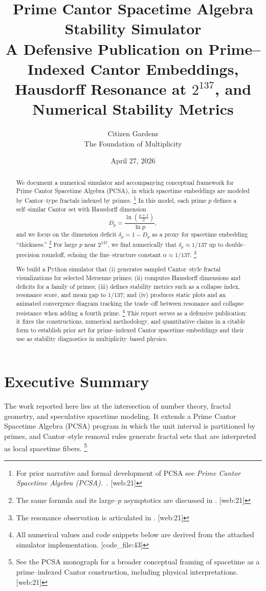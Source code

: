 \documentclass[11pt]{article}
\title{%
Prime Cantor Spacetime Algebra Stability Simulator\\[4pt]
\large A Defensive Publication on Prime–Indexed Cantor Embeddings,\\
Hausdorff Resonance at $2^{137}$, and Numerical Stability Metrics}
\author{Citizen Gardens \\ The Foundation of Multiplicity}
\date{April 27, 2026}
\begin{document}
\maketitle

\begin{abstract}
We document a numerical simulator and accompanying conceptual framework for Prime Cantor Spacetime Algebra (PCSA), in which spacetime embeddings are modeled by Cantor--type fractals indexed by primes.%
\footnote{For prior narrative and formal development of PCSA see \emph{Prime Cantor Spacetime Algebra (PCSA).}~\cite{pcsa_gist}. [web:21]} 
In this model, each prime $p$ defines a self--similar Cantor set with Hausdorff dimension
\[
  D_p = \frac{\ln\left(\frac{p+1}{2}\right)}{\ln p},
\]
and we focus on the dimension deficit $\delta_p = 1 - D_p$ as a proxy for spacetime embedding ``thickness.''%
\footnote{The same formula and its large--$p$ asymptotics are discussed in \cite{pcsa_gist}. [web:21]} 
For large $p$ near $2^{137}$, we find numerically that $\delta_p \approx 1/137$ up to double--precision roundoff, echoing the fine--structure constant $\alpha\approx 1/137$.%
\footnote{The resonance observation is articulated in \cite{pcsa_gist}. [web:21]} 

We build a Python simulator that (i) generates sampled Cantor--style fractal visualizations for selected Mersenne primes; (ii) computes Hausdorff dimensions and deficits for a family of primes; (iii) defines stability metrics such as a collapse index, resonance score, and mean gap to $1/137$; and (iv) produces static plots and an animated convergence diagram tracking the trade--off between resonance and collapse resistance when adding a fourth prime.%
\footnote{All numerical values and code snippets below are derived from the attached simulator implementation. [code\_file:43]} 
This report serves as a defensive publication: it fixes the constructions, numerical methodology, and quantitative claims in a citable form to establish prior art for prime--indexed Cantor spacetime embeddings and their use as stability diagnostics in multiplicity--based physics.
\end{abstract}
\newpage
\tableofcontents

\section{Executive Summary}

The work reported here lies at the intersection of number theory, fractal geometry, and speculative spacetime modeling. It extends a Prime Cantor Spacetime Algebra (PCSA) program in which the unit interval is partitioned by primes, and Cantor--style removal rules generate fractal sets that are interpreted as local spacetime fibers.%
\footnote{See the PCSA monograph for a broader conceptual framing of spacetime as a prime--indexed Cantor construction, including physical interpretations. [web:21]} 
\end{document}
